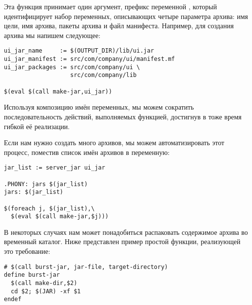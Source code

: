 Эта функция принимает один аргумент, префикс переменной \GNUmake{},
который идентифицирует набор переменных, описывающих четыре параметра
архива: имя цели, имя архива, пакеты архива и файл манифеста.
Например, для создания архива  мы напишем следующее:

{\footnotesize
\begin{verbatim}
ui_jar_name     := $(OUTPUT_DIR)/lib/ui.jar
ui_jar_manifest := src/com/company/ui/manifest.mf
ui_jar_packages := src/com/company/ui \
                   src/com/company/lib

$(eval $(call make-jar,ui_jar))
\end{verbatim}
}

Используя композицию имён переменных, мы можем сократить
последовательность действий, выполняемых функцией, достигнув в тоже
время гибкой её реализации.

Если нам нужно создать много архивов, мы можем автоматизировать этот
процесс, поместив список имён архивов в переменную:

{\footnotesize
\begin{verbatim}
jar_list := server_jar ui_jar

.PHONY: jars $(jar_list)
jars: $(jar_list)

$(foreach j, $(jar_list),\
  $(eval $(call make-jar,$j)))
\end{verbatim}
}

В некоторых случаях нам может понадобиться распаковать содержимое
архива во временный каталог. Ниже представлен пример простой функции,
реализующей это требование:

{\footnotesize
\begin{verbatim}
# $(call burst-jar, jar-file, target-directory)
define burst-jar
  $(call make-dir,$2)
  cd $2; $(JAR) -xf $1
endef
\end{verbatim}
}
